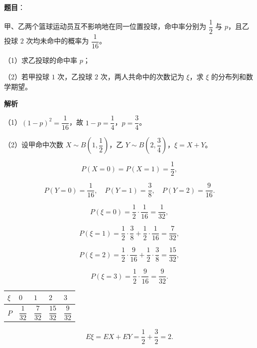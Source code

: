 \begin{answer}

\textbf{题目}：

甲、乙两个篮球运动员互不影响地在同一位置投球，命中率分别为 $\dfrac12$ 与 $p$，且乙投球 $2$ 次均未命中的概率为 $\dfrac1{16}$。

（1）求乙投球的命中率 $p$；

（2）若甲投球 $1$ 次，乙投球 $2$ 次，两人共命中的次数记为 $\xi$，求 $\xi$ 的分布列和数学期望。

\textbf{解析}

（1）$(1-p)^2=\dfrac1{16}$，故 $1-p=\dfrac14$，$p=\dfrac34$。

（2）设甲命中次数 $X\sim B\left(1,\dfrac12\right)$，乙 $Y\sim B\left(2,\dfrac34\right)$，$\xi=X+Y$。

\nopagebreak[4]
\[P(X=0)=P(X=1)=\frac12,\]

\nopagebreak[4]
\[P(Y=0)=\frac1{16},\quad P(Y=1)=\frac38,\quad P(Y=2)=\frac9{16}.\]

\nopagebreak[4]
\[P(\xi=0)=\frac12\cdot\frac1{16}=\frac1{32},\]

\nopagebreak[4]
\[P(\xi=1)=\frac12\cdot\frac38+\frac12\cdot\frac1{16}=\frac7{32},\]

\nopagebreak[4]
\[P(\xi=2)=\frac12\cdot\frac9{16}+\frac12\cdot\frac38=\frac{15}{32},\]

\nopagebreak[4]
\[P(\xi=3)=\frac12\cdot\frac9{16}=\frac9{32}.\]

\begin{center}
\begin{tabular}{lllll}
\toprule
$\xi$ & $0$ & $1$ & $2$ & $3$ \\
\midrule
$P$ & $\dfrac1{32}$ & $\dfrac7{32}$ & $\dfrac{15}{32}$ & $\dfrac9{32}$ \\
\bottomrule
\end{tabular}
\end{center}

\nopagebreak[4]
\[E\xi=EX+EY=\frac12+\frac32=2.\]


\end{answer}
